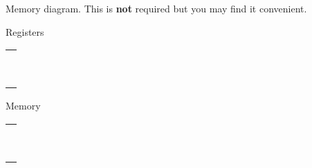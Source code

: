\documentclass[12pt]{article}
\begin{document}
\begin{table}[!htb]
\centering
Memory diagram. This is \textbf{not} required but you may find it convenient. 

\vspace{1cm}

\huge
    \begin{minipage}{.5\linewidth}
      \centering
      Registers
        \begin{tabular}{|c|}
            \hline
            \hspace{4cm} \\
            \hline
            \\
            \hline
            \\
            \hline
            \\
            \hline
            \\
            \hline
            \\
            \hline
            \\
            \hline
            \\
            \hline
            \\
            \hline
            \\
            \hline
        \end{tabular}
    \end{minipage}%
    \begin{minipage}{.5\linewidth}
      \centering
        Memory
        \begin{tabular}{|c|}
            \hline
            \hspace{4cm} \\
            \hline
            \\
            \hline
            \\
            \hline
            \\
            \hline
            \\
            \hline
            \\
            \hline
            \\
            \hline
            \\
            \hline
            \\
            \hline
            \\
            \hline
        \end{tabular}
    \end{minipage} 
\end{table}
\end{document}
